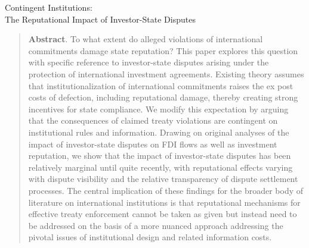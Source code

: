 \documentclass[12pt,onesided]{amsart}
\begin{document}
\thispagestyle{empty}

\begin{center}
{\sc \large Contingent Institutions: \\ The Reputational Impact of Investor-State Disputes}
\end{center}



\vspace{20mm}

\begin{quote}
\noindent \textbf{Abstract}. To what extent do alleged violations of international commitments damage state reputation? This paper explores this question with specific reference to investor-state disputes arising under the protection of international investment agreements. Existing theory assumes that institutionalization of international commitments raises the ex post costs of defection, including reputational damage, thereby creating strong incentives for state compliance. We modify this expectation by arguing that the consequences of claimed treaty violations are contingent on institutional rules and information. Drawing on original analyses of the impact of investor-state disputes on  FDI flows as well as  investment reputation, we show that the impact of investor-state disputes has been relatively marginal until quite recently, with reputational effects varying with dispute visibility and the relative transparency of dispute settlement processes. The central implication of these findings for the broader body of literature on international institutions is that reputational mechanisms for effective treaty enforcement cannot be taken as given but instead need to be addressed on the basis of a more nuanced approach addressing the pivotal issues of institutional design and related information costs.
\end{quote}
 
\vspace{10mm}
\end{document}
